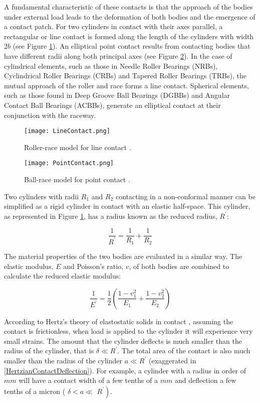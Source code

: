 A fundamental characteristic of these contacts is that the approach of the bodies under external load leads to the deformation of both bodies and the emergence of a contact patch. For two cylinders in contact with their axes parallel, a rectangular or line contact is formed along the length of the cylinders with width $2b$ (see Figure \ref{LineContact}). An elliptical point contact results from contacting bodies that have different radii along both principal axes \cite{Johnson1985} (see Figure \ref{PointContact}). In the case of cylindrical elements, such as those in Needle Roller Bearings (NRBs), Cyclindrical Roller Bearings (CRBs) and Tapered Roller Bearings (TRBs), the mutual approach of the roller and race forms a line contact. Spherical elements, such as those found in Deep Groove Ball Bearings (DGBBs) and Angular Contact Ball Bearings (ACBBs), generate an elliptical contact at their conjunction with the raceway.

\begin{figure}
	\centerline{\texttt{[image: LineContact.png]}}
	\caption{Roller-race model for line contact \cite{Zaretsky2016}.}
	\label{LineContact}
\end{figure}

\begin{figure}
	\centerline{\texttt{[image: PointContact.png]}}
	\caption{Ball-race model for point contact \cite{Zaretsky2016}.}
	\label{PointContact}
\end{figure}

Two cylinders with radii $R_1$ and $R_2$ contacting in a non-conformal manner can be simplified as a rigid cylinder in contact with an elastic half-space. This cylinder, as represented in Figure \ref{LineContact}, has a radius known as the reduced radius, $R^{\prime}$:

\begin{equation}\label{eq2.1}
	\frac{1}{R^{\prime}}=\frac{1}{R_1}+\frac{1}{R_2}
\end{equation}

The material properties of the two bodies are evaluated in a similar way. The elastic modulus, $E$ and Poisson's ratio, $v$, of both bodies are combined to calculate the reduced elastic modulus:

\begin{equation}\label{eq2.2}
	\frac{1}{E^{\prime}}=\frac{1}{2}\left(\frac{1-v_1^2}{E_1}+\frac{1-v_2^2}{E_2}\right)
\end{equation}

According to Hertz's theory of elastostatic solids in contact \cite{Hertz1881}, assuming the contact is frictionless, when load is applied to the cylinder it will experience very small strains. The amount that the cylinder deflects is much smaller than the radius of the cylinder, that is $\delta \ll R^{\prime}$. The total area of the contact is also much smaller than the radius of the cylinder $a \ll R^{\prime}$ (exaggerated in \ref{HertzianContactDeflection}). For example, a cylinder with a radius in order of $mm$ will have a contact width of a few tenths of a $mm$ and deflection a few tenths of a micron ( $\delta<a \ll$ $\left.R^{\prime}\right)$.

